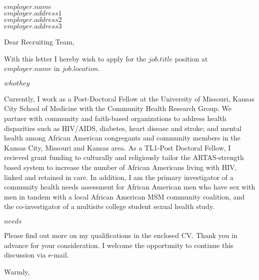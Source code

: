 \documentclass[11pt,a4paper]{letter}
\begin{document}
 
\begin{letter}{$employer.name$ \\ $employer.address1$ \\ $employer.address2$ \\ $employer.address3$} 
\opening{Dear Recruiting Team,} 
With this letter I hereby wish to apply for the \textbf{$job.title$} position at $employer.name$ in $job.location$.

$whothey$

Currently, I work as a Post-Doctoral Fellow at the University of Missouri, Kansas City School of Medicine with the Community Health Research Group. We partner with community and faith-based organizations to address health disparities such as HIV/AIDS, diabetes, heart disease and stroke; and mental health among African American congregants and community members in the Kansas City, Missouri and Kansas area. As a TL1-Post Doctoral Fellow, I recieved grant funding to culturally and religiously tailor the ARTAS-strength based system to increase the number of African Americans living with HIV, linked and retained in care. In addition, I am the primary investigator of a community health needs assessment for African American men who have sex with men in tandem with a local African American MSM community coalition, and the co-investigator of a multisite college student sexual health study.

$needs$

Please find out more on my qualifications in the enclosed CV. Thank you in advance for your consideration. I welcome the opportunity to continue this discussion via e-mail.

\closing\hfill{Warmly,\\
 \\
}

\end{letter} 
\end{document}
